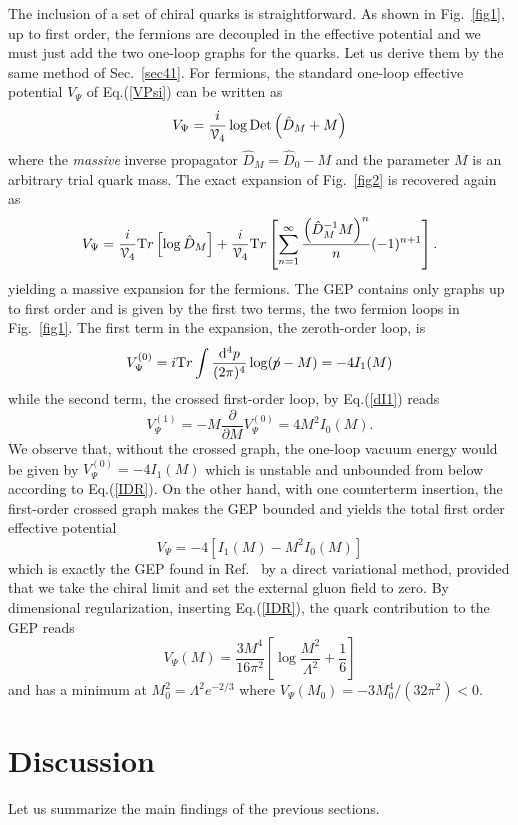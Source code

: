 \documentclass[aps,preprint]{revtex4}
\newcommand{\BE}{\begin{equation}}
\newcommand{\EE}{\end{equation}}
\newcommand{\Tr}{\mathrm Tr}
\newcommand{\ppp}{ \frac{{\rm d}^4p}{(2\pi)^4}}
\newcommand{\fsl}[1]{\ensuremath{\mathrlap{\!\not{\phantom{#1}}}#1}}
\begin{document}
The inclusion of a set of chiral quarks is straightforward. As shown in Fig.~\ref{fig1},
up to first order, the fermions are decoupled in the effective potential and we must just add the
two one-loop graphs for the quarks. Let us derive them by the same method of Sec.~\ref{sec41}.
For fermions, the standard one-loop effective potential $V_\Psi$ of Eq.(\ref{VPsi}) can be written
as
\BE
V_\Psi=\frac{i}{{\cal V}_4} \log {\rm Det} \left( \hat D_M+M\right)
\label{VPsiM}
\EE
where the {\it massive} inverse propagator $\hat D_M=\hat D_0-M$ and the parameter $M$ is an arbitrary trial
quark mass. The exact expansion of Fig.~\ref{fig2} is recovered again as
\BE
V_\Psi=\frac{i}{{\cal V}_4} \Tr\left[\log \hat D_M\right]
+\frac{i}{{\cal V}_4} \Tr\left[ 
\sum_{n=1}^{\infty}\frac{\left(\hat D_M^{-1} M\right)^n}{n}(-1)^{n+1}\right]. 
\label{VTr}
\EE
yielding a massive expansion for the fermions.
The GEP contains only graphs up to first order and is given by the first two terms, the two fermion loops
in Fig.~\ref{fig1}. The first term in the expansion, the zeroth-order loop, is
\BE
V_\Psi^{(0)}=i \Tr\int \ppp \log ( \fsl p-M)=-4 I_1(M)
\label{VPsi0}
\EE
while the second term, the crossed first-order loop, by Eq.(\ref{dI1}) reads
\BE
V_\Psi^{(1)}=-M\frac{\partial}{\partial M} V_\Psi^{(0)}=4 M^2 I_0(M).
\label{VPsi1}
\EE
We observe that, without the crossed graph, the one-loop vacuum energy 
would be given by $V_\Psi^{(0)}=-4 I_1(M)$ which is unstable and unbounded from below according to Eq.(\ref{IDR}).
On the other hand, with one counterterm insertion, the first-order crossed graph makes the GEP
bounded and yields the total first order effective potential
\BE
V_\Psi=-4\left[I_1(M)-M^2 I_0(M)\right]
\label{VPsiG}
\EE
which is exactly the GEP found in Ref.~ by a direct variational method, provided that we take
the chiral limit and set the external gluon field to zero. By dimensional regularization, inserting Eq.(\ref{IDR}),
the quark contribution to the GEP reads
\BE
V_\Psi(M)=\frac{3 M^4}{16\pi^2}\left[\log\frac{M^2}{\Lambda^2} +\frac{1}{6}\right]
\label{VPsiL}
\EE
and has a minimum at $M_0^2=\Lambda^2 e^{-2/3}$ where $V_\Psi (M_0)=-3M_0^4/(32\pi^2)<0$.

\section{Discussion}\label{disc}

Let us summarize the main findings of the previous sections. 
\end{document}
